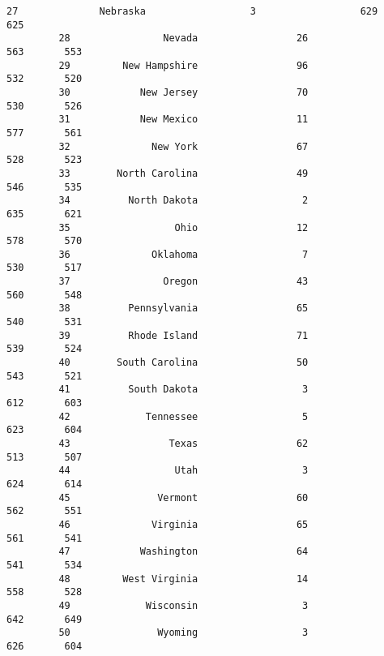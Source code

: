 \documentclass[11pt]{article}
\begin{document}
\begin{Verbatim}[commandchars=\\\{\}]
         27              Nebraska                  3                  629       625   
         28                Nevada                 26                  563       553   
         29         New Hampshire                 96                  532       520   
         30            New Jersey                 70                  530       526   
         31            New Mexico                 11                  577       561   
         32              New York                 67                  528       523   
         33        North Carolina                 49                  546       535   
         34          North Dakota                  2                  635       621   
         35                  Ohio                 12                  578       570   
         36              Oklahoma                  7                  530       517   
         37                Oregon                 43                  560       548   
         38          Pennsylvania                 65                  540       531   
         39          Rhode Island                 71                  539       524   
         40        South Carolina                 50                  543       521   
         41          South Dakota                  3                  612       603   
         42             Tennessee                  5                  623       604   
         43                 Texas                 62                  513       507   
         44                  Utah                  3                  624       614   
         45               Vermont                 60                  562       551   
         46              Virginia                 65                  561       541   
         47            Washington                 64                  541       534   
         48         West Virginia                 14                  558       528   
         49             Wisconsin                  3                  642       649   
         50               Wyoming                  3                  626       604   
         

\end{Verbatim}
\end{document}
